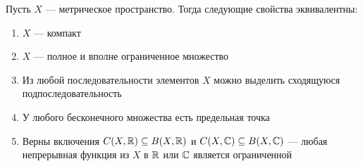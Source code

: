 \begin{theorem}
	Пусть $X$ --- метрическое пространство. Тогда следующие свойства эквивалентны:
	\begin{enumerate}
		\item $X$ --- компакт
		
		\item $X$ --- полное и вполне ограниченное множество
		
		\item Из любой последовательности элементов $X$ можно выделить сходящуюся подпоследовательность
		
		\item У любого бесконечного множества есть предельная точка
		
		\item Верны включения $C(X, \mathbb{R}) \subseteq B(X, \mathbb{R})$ и $C(X, \mathbb{C}) \subseteq B(X, \mathbb{C})$ --- любая непрерывная функция из $X$ в $\mathbb{R}$ или $\mathbb{C}$ является ограниченной
	\end{enumerate}
\end{theorem}